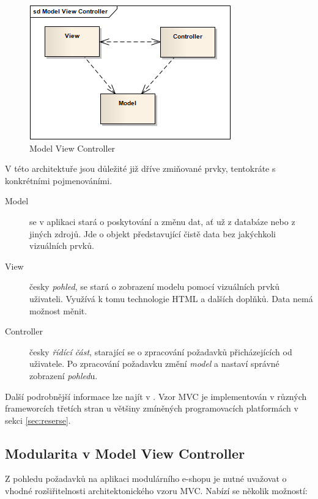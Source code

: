 \documentclass[11pt,twoside,a4paper]{book}
\begin{document}
\begin{figure}[h!]
\begin{center}
\includegraphics[scale=0.75]{figures/mvc}
\caption{Model View Controller}
\label{fig:mvc}
\end{center}
\end{figure}

V této architektuře jsou důležité již dříve zmiňované prvky, tentokráte s konkrétními pojmenováními.

\begin{description}
\item[Model] se v aplikaci stará o poskytování a změnu dat, ať už z databáze nebo z jiných zdrojů. Jde o objekt představující čistě data bez jakýchkoli vizuálních prvků.
\item[View] česky \textit{pohled}, se stará o zobrazení modelu pomocí vizuálních prvků uživateli. Využívá k tomu technologie HTML a dalších doplňků. Data nemá možnost měnit.
\item[Controller] česky \textit{řídící část}, starající se o zpracování požadavků přicházejících od uživatele. Po zpracování požadavku změní \textit{model} a nastaví správné zobrazení \textit{pohled}u.
\end{description}

Další podrobnější informace lze najít v \citep{PEAA}. Vzor MVC je implementován v různých frameworcích třetích stran u většiny zmíněných programovacích platformách v sekci \ref{sec:reserse}.

\subsection{Modularita v Model View Controller}

Z pohledu požadavků na aplikaci modulárního e-shopu je nutné uvažovat o vhodné rozšiřitelnosti architektonického vzoru MVC. Nabízí se několik možností:
\end{document}
